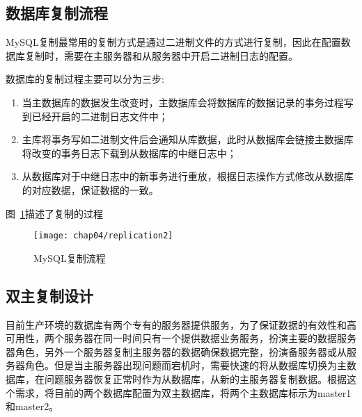 \subsection{数据库复制流程}
MySQL复制最常用的复制方式是通过二进制文件的方式进行复制，因此在配置数据库复制时，需要在主服务器和从服务器中开启二进制日志的配置。

数据库的复制过程主要可以分为三步:
\begin{enumerate}
\item 当主数据库的数据发生改变时，主数据库会将数据库的数据记录的事务过程写到已经开启的二进制日志文件中；
\item 主库将事务写如二进制文件后会通知从库数据，此时从数据库会链接主数据库将改变的事务日志下载到从数据库的中继日志中；
\item 从数据库对于中继日志中的新事务进行重放，根据日志操作方式修改从数据库的对应数据，保证数据的一致\cite{秦金2013分布式}。
\end{enumerate}
图~\ref{fig:replication2}描述了复制的过程
\begin{figure}[H] %
  \centering
  \texttt{[image: chap04/replication2]}
  \caption{MySQL复制流程}
  \label{fig:replication2}
\end{figure}




\subsection{双主复制设计}
目前生产环境的数据库有两个专有的服务器提供服务，为了保证数据的有效性和高可用性，两个服务器在同一时间只有一个提供数据业务服务，扮演主要的数据服务器角色，另外一个服务器复制主服务器的数据确保数据完整，扮演备服务器或从服务器角色。但是当主服务器出现问题而宕机时，需要快速的将从数据库切换为主数据库，在问题服务器恢复正常时作为从数据库，从新的主服务器复制数据。根据这个需求，将目前的两个数据库配置为双主数据库，将两个主数据库标示为master1和master2。

